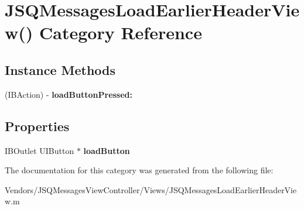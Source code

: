 \hypertarget{category_j_s_q_messages_load_earlier_header_view_07_08}{}\section{J\+S\+Q\+Messages\+Load\+Earlier\+Header\+View() Category Reference}
\label{category_j_s_q_messages_load_earlier_header_view_07_08}
\subsection*{Instance Methods}
\begin{DoxyCompactItemize}
\item 
\hypertarget{category_j_s_q_messages_load_earlier_header_view_07_08_ab13e0f6028d299afaf97a42d984fbc6b}{}(I\+B\+Action) -\/ {\bfseries load\+Button\+Pressed\+:}\label{category_j_s_q_messages_load_earlier_header_view_07_08_ab13e0f6028d299afaf97a42d984fbc6b}

\end{DoxyCompactItemize}
\subsection*{Properties}
\begin{DoxyCompactItemize}
\item 
\hypertarget{category_j_s_q_messages_load_earlier_header_view_07_08_a92b439c8a31df28459a67034fc4aa80d}{}I\+B\+Outlet U\+I\+Button $\ast$ {\bfseries load\+Button}\label{category_j_s_q_messages_load_earlier_header_view_07_08_a92b439c8a31df28459a67034fc4aa80d}

\end{DoxyCompactItemize}


The documentation for this category was generated from the following file\+:\begin{DoxyCompactItemize}
\item 
Vendors/\+J\+S\+Q\+Messages\+View\+Controller/\+Views/J\+S\+Q\+Messages\+Load\+Earlier\+Header\+View.\+m\end{DoxyCompactItemize}
